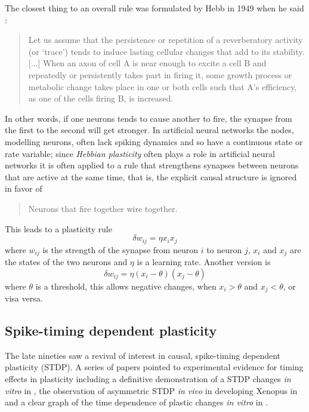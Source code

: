 \documentclass{article}
\begin{document}
The closest thing to an overall rule was formulated by Hebb in 1949
when he said \cite{Hebb1949a}:
\begin{quote}
Let us assume that the persistence or repetition of a reverberatory
activity (or \lq{}trace\rq{}) tends to induce lasting cellular changes that
add to its stability. [$\ldots$] When an axon of cell A is near enough to excite
a cell B and repeatedly or persistently takes part in firing it, some
growth process or metabolic change takes place in one or both cells
such that A's efficiency, as one of the cells firing B, is increased.
\end{quote}
In other words, if one neurons tends to cause another to fire, the
synapse from the first to the second will get stronger. In artificial
neural networks the nodes, modelling neurons, often lack spiking
dynamics and so have a continuous state or rate variable; since
\textsl{Hebbian plasticity} often plays a role in artificial neural
networks it is often applied to a rule that strengthens synapses
between neurons that are active at the same time, that is, the
explicit causal structure is ignored in favor of
\begin{quote}
Neurons that fire together wire together.
\end{quote}
This leads to a plasticity rule 
\begin{equation}
\delta w_{ij}=\eta x_i x_j
\end{equation}
where $w_{ij}$ is the strength of the synapse from neuron $i$ to
neuron $j$, $x_i$ and $x_j$ are the states of the two neurons and
$\eta$ is a learning rate. Another version is
\begin{equation}
\delta w_{ij}=\eta (x_i-\theta)(x_j-\theta)
\end{equation}
where $\theta$ is a threshold, this allows negative changes, when
$x_i>\theta$ and $x_j<\theta$, or visa versa.

\subsection*{Spike-timing dependent plasticity}

The late nineties saw a revival of interest in causal, spike-timing
dependent plasticity (STDP). A series of papers pointed to experimental
evidence for timing effects in plasticity
\cite{MarkramSakmann1995a,MarkramEtAl1997a,BellEtAl1997a,MageeJohnston1997a,DebanneGahwilerThompson1998a}
including a definitive demonstration of a STDP changes \textsl{in vitro} in \cite{MarkramEtAl1997a}, the
observation of asymmetric STDP \textsl{in vivo} in developing Xenopus
in \cite{ZhangTaoHoltHarrisPoo1998a} and a clear graph of the time
dependence of plastic changes \textsl{in vitro} in \cite{BiPoo1998a}.
\end{document}

